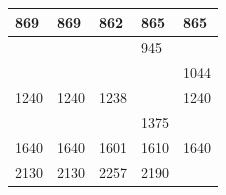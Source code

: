 \begin{table}
\begin{tabular}{|l|l|l|l|l|}
        869                         & 869                         & 862                         & 865                         & 865                         \\ \hline
                                    &                             &                             & {\color[HTML]{FE0000} 945}  &                             \\ \hline
                                    &                             &                             &                             & 1044                        \\ \hline
        {\color[HTML]{FFCB2F} 1240} & {\color[HTML]{FFCB2F} 1240} & {\color[HTML]{FFCB2F} 1238} &                             & {\color[HTML]{FFCB2F} 1240} \\ \hline
                                    &                             &                             & {\color[HTML]{FE0000} 1375} &                             \\ \hline
        {\color[HTML]{34FF34} 1640} & {\color[HTML]{34FF34} 1640} & {\color[HTML]{34FF34} 1601} & {\color[HTML]{34FF34} 1610} & {\color[HTML]{34FF34} 1640} \\ \hline
        {\color[HTML]{34FF34} 2130} & {\color[HTML]{34FF34} 2130} & {\color[HTML]{34FF34} 2257} & {\color[HTML]{34FF34} 2190} &                             \\ \hline
        \end{tabular}
        \label{pca:tab:bandas}
        \end{table}
        
